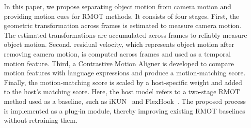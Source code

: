 \documentclass{article}
\begin{document}

In this paper, we propose separating object motion from camera motion and providing motion cues for RMOT methods. It consists of four stages. First, the geometric transformation across frames is estimated to measure camera motion. The estimated transformations are accumulated across frames to reliably measure object motion. Second, residual velocity, which represents object motion after removing camera motion, is computed across frames and used as a temporal motion feature. Third, a Contrastive Motion Aligner is developed to compare motion features with language expressions and produce a motion-matching score. Finally, the motion-matching score is scaled by a host-specific weight and added to the host's matching score. Here, the host model refers to a two-stage RMOT method used as a baseline, such as iKUN~\cite{ikun} and FlexHook~\cite{flexhook}. The proposed process is implemented as a plug-in module, thereby improving existing RMOT baselines without retraining them. 


\end{document}
